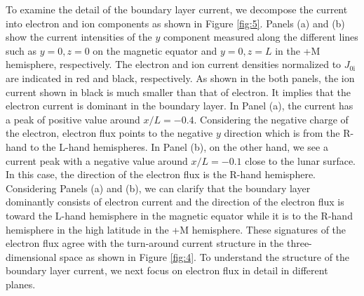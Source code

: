 \documentclass[draft,jgrga]{agutex2015}
\begin{document}
\begin{article}
To examine the detail of the boundary layer current, 
we decompose the current into electron and ion components  
as shown in Figure \ref{fig:5}. 
Panels (a) and (b) show the current intensities of the $y$ component 
measured along the different lines such as $y=0, z=0$ on the magnetic equator 
and $y=0, z=L$ in the +M hemisphere, respectively.
The electron and ion current densities normalized to $J_\mathrm{0i}$ are 
indicated in red and black, respectively. 
As shown in the both panels, 
the ion current shown in black is much smaller than that of electron. 
It implies that the electron current is dominant in the boundary layer.
In Panel (a), 
the current has a peak of positive value around $x/L=-0.4$. 
Considering the negative charge of the electron, 
electron flux points to the negative $y$ direction which is 
from the R-hand to the L-hand hemispheres. 
In Panel (b), on the other hand,  
we see a current peak with a negative value around $x/L=-0.1$ 
close to the lunar surface. 
In this case, the direction of the electron flux is the R-hand hemisphere.  
Considering Panels (a) and (b), 
we can clarify that the boundary layer dominantly consists of electron current 
and the direction of the electron flux is
toward the L-hand hemisphere in the magnetic equator while
it is to the R-hand hemisphere in the high latitude in the +M hemisphere.
These signatures of the electron flux agree with the
turn-around current structure in the three-dimensional space 
as shown in Figure \ref{fig:4}.
To understand the structure of the boundary layer current, 
we next focus on electron flux in detail in different planes.



\end{article}
\end{document}

